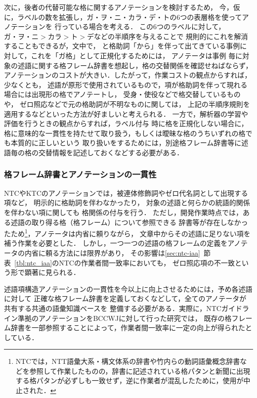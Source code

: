 \documentclass[japanese]{jnlp_1.4}
\begin{document}
次に，後者の代替可能な格に関するアノテーションを検討するため，
今，仮に，ラベルの数を拡張し，ガ・ヲ・ニ・カラ・デ・トの6つの表層格を使ってアノテーションを
行っている場合を考える．
この6つのラベルに対して，$ガ・ヲ・ニ > カラ > ト > デ$などの半順序を与えることで
規則的にこれを解消することもできるが，文中で，
と格助詞「から」を伴って出てきている事例に対して，これを「ガ格」として正規化するためには，
アノテータは事例
毎に対象の述語に関する格フレーム辞書を想起し，格の交替関係を確認せねばならず，
アノテーションのコストが大きい．したがって，作業コストの観点からすれば，少なくとも，
述語が原形で使用されているもので，項が格助詞を伴って現れる場合には出現形の格でアノテートし，
受身・使役などで格交替しているものや，
ゼロ照応などで元の格助詞が不明なものに関しては，
上記の半順序規則を適用するなどといった方法が好ましいと考えられる．
一方で，解析器の学習や評価を行うときの観点からすれば，ラベル付与
時に格を正規化しない場合に，格に意味的な一貫性を持たせて取り扱う，もしくは曖昧な格のうちいずれの格でも本質的に正しいという
取り扱いをするためには，別途格フレーム辞書等に述語毎の格の交替情報を記述しておくなどする必要がある．


\subsubsection{格フレーム辞書とアノテーションの一貫性}
\label{sec:frame-dictionary}

NTCやKTCのアノテーションでは，被連体修飾詞やゼロ代名詞として出現する項など，
明示的に格助詞を伴わなかったり，
対象の述語と何らかの統語的関係を伴わない項に関しても
格関係の付与を行う．
\pagebreak
ただし，開発作業時点では，ある述語の取り得る格（格フレーム）について参照できる
辞書等が存在しなかったため\footnote{
NTCでは，NTT語彙大系・構文体系の辞書\cite{nttlexicon}や竹内らの動詞語彙概念辞書\cite{takeuchi2005}などを参照して作業したものの，辞書に記述されている格パタンと新聞に出現する格パタンが必ずしも一致せず，逆に作業者が混乱したために，使用が中止された．}，アノテータは内省に頼りながら，
文章中からその述語に足りない項を補う作業を必要とした．
しかし，一つ一つの述語の格フレームの定義をアノテータの内省に頼る方法には限界があり，
その影響は\ref{sec:ntc-iaa}~節表~\ref{tbl:ntc_iaa}のNTCの作業者間一致率においても，
ゼロ照応項の不一致という形で顕著に見られる．

述語項構造アノテーションの一貫性を今以上に向上させるためには，予め各述語に対して
正確な格フレーム辞書を定義しておくなどして，全てのアノテータが共有する共通の語彙知識ベースを
整備する必要がある．実際に，NTCガイドライン準拠のアノテーションをBCCWJに対して行った研究\cite{komachi2011}では，
既存の格フレーム辞書を一部参照することによって，作業者間一致率に一定の向上が得られたとしている．
\end{document}
